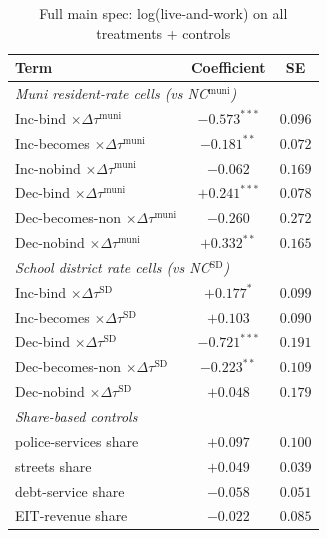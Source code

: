 \documentclass[12pt]{article}
\begin{document}
\begin{table}[!htbp]
    \centering
    \caption{Full main spec: log(live-and-work) on all treatments + controls}
    \label{tab:full-spec}
    \footnotesize
    \renewcommand{\arraystretch}{0.85}
    \begin{tabular}{lcc}
        \toprule
        Term & Coefficient & SE \\
        \midrule
        \multicolumn{3}{l}{\textit{Muni resident-rate cells (vs NC$^{\text{muni}}$)}} \\
        Inc-bind $\times \Delta\tau^{\text{muni}}$       & $-0.573^{***}$ & $0.096$ \\
        Inc-becomes $\times \Delta\tau^{\text{muni}}$    & $-0.181^{**}$  & $0.072$ \\
        Inc-nobind $\times \Delta\tau^{\text{muni}}$     & $-0.062$       & $0.169$ \\
        Dec-bind $\times \Delta\tau^{\text{muni}}$       & $+0.241^{***}$ & $0.078$ \\
        Dec-becomes-non $\times \Delta\tau^{\text{muni}}$ & $-0.260$       & $0.272$ \\
        Dec-nobind $\times \Delta\tau^{\text{muni}}$     & $+0.332^{**}$  & $0.165$ \\
        \midrule
        \multicolumn{3}{l}{\textit{School district rate cells (vs NC$^{\text{SD}}$)}} \\
        Inc-bind $\times \Delta\tau^{\text{SD}}$         & $+0.177^{*}$   & $0.099$ \\
        Inc-becomes $\times \Delta\tau^{\text{SD}}$      & $+0.103$       & $0.090$ \\
        Dec-bind $\times \Delta\tau^{\text{SD}}$         & $-0.721^{***}$ & $0.191$ \\
        Dec-becomes-non $\times \Delta\tau^{\text{SD}}$  & $-0.223^{**}$  & $0.109$ \\
        Dec-nobind $\times \Delta\tau^{\text{SD}}$       & $+0.048$       & $0.179$ \\
        \midrule
        \multicolumn{3}{l}{\textit{Share-based controls}} \\
        police-services share                                     & $+0.097$       & $0.100$ \\
        streets share                                    & $+0.049$       & $0.039$ \\
        debt-service share                                  & $-0.058$       & $0.051$ \\
        EIT-revenue share                                        & $-0.022$       & $0.085$ \\

\end{tabular}
\end{table}
\end{document}
